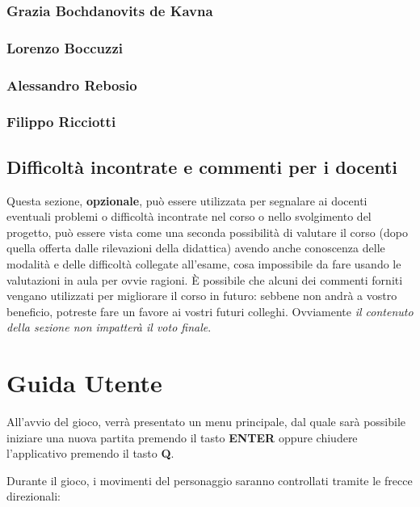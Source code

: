 \documentclass[a4paper,12pt]{report}
\begin{document}
\subsection{Grazia Bochdanovits de Kavna}

\subsection{Lorenzo Boccuzzi}

\subsection{Alessandro Rebosio}

\subsection{Filippo Ricciotti}

\section{Difficoltà incontrate e commenti per i docenti}

Questa sezione, \textbf{opzionale}, può essere utilizzata per segnalare ai docenti eventuali problemi o difficoltà incontrate nel corso o nello svolgimento del progetto, può essere vista come una seconda possibilità di valutare il corso (dopo quella offerta dalle rilevazioni della didattica) avendo anche conoscenza delle modalità e delle difficoltà collegate all'esame, cosa impossibile da fare usando le valutazioni in aula per ovvie ragioni.
%
È possibile che alcuni dei commenti forniti vengano utilizzati per migliorare il corso in futuro: sebbene non andrà a vostro beneficio, potreste fare un favore ai vostri futuri colleghi.
%
Ovviamente \textit{il contenuto della sezione non impatterà il voto finale}.


\appendix

\chapter{Guida Utente}

All'avvio del gioco, verrà presentato un menu principale, dal quale sarà possibile iniziare una nuova partita premendo il tasto \textbf{ENTER} oppure chiudere l'applicativo premendo il tasto \textbf{Q}.

Durante il gioco, i movimenti del personaggio saranno controllati tramite le frecce direzionali:
\end{document}
